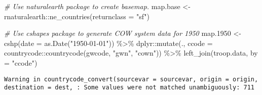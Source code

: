 \documentclass[
]{book}
\newenvironment{Shaded}{\begin{snugshade}}{\end{snugshade}}
\newcommand{\AttributeTok}[1]{\textcolor[rgb]{0.77,0.63,0.00}{#1}}
\newcommand{\CommentTok}[1]{\textcolor[rgb]{0.56,0.35,0.01}{\textit{#1}}}
\newcommand{\FloatTok}[1]{\textcolor[rgb]{0.00,0.00,0.81}{#1}}
\newcommand{\FunctionTok}[1]{\textcolor[rgb]{0.00,0.00,0.00}{#1}}
\newcommand{\NormalTok}[1]{#1}
\newcommand{\OtherTok}[1]{\textcolor[rgb]{0.56,0.35,0.01}{#1}}
\newcommand{\SpecialCharTok}[1]{\textcolor[rgb]{0.00,0.00,0.00}{#1}}
\newcommand{\StringTok}[1]{\textcolor[rgb]{0.31,0.60,0.02}{#1}}
\theoremstyle{definition}
\theoremstyle{definition}
\theoremstyle{definition}
\theoremstyle{definition}
\theoremstyle{remark}
\begin{document}
\begin{Shaded}
\begin{Highlighting}[]
\CommentTok{\# Use naturalearth package to create basemap.}
\NormalTok{map.base }\OtherTok{\textless{}{-}}\NormalTok{ rnaturalearth}\SpecialCharTok{::}\FunctionTok{ne\_countries}\NormalTok{(}\AttributeTok{returnclass =} \StringTok{"sf"}\NormalTok{)}

\CommentTok{\# Use cshapes package to generate COW system data for 1950}
\NormalTok{map}\FloatTok{.1950} \OtherTok{\textless{}{-}} \FunctionTok{cshp}\NormalTok{(}\AttributeTok{date =} \FunctionTok{as.Date}\NormalTok{(}\StringTok{"1950{-}01{-}01"}\NormalTok{)) }\SpecialCharTok{\%\textgreater{}\%}  
\NormalTok{  dplyr}\SpecialCharTok{::}\FunctionTok{mutate}\NormalTok{(., }\AttributeTok{ccode =}\NormalTok{ countrycode}\SpecialCharTok{::}\FunctionTok{countrycode}\NormalTok{(gwcode, }\StringTok{"gwn"}\NormalTok{, }\StringTok{"cown"}\NormalTok{)) }\SpecialCharTok{\%\textgreater{}\%} 
  \FunctionTok{left\_join}\NormalTok{(troop.data, }\AttributeTok{by =} \StringTok{"ccode"}\NormalTok{)}
\end{Highlighting}
\end{Shaded}

\begin{verbatim}
Warning in countrycode_convert(sourcevar = sourcevar, origin = origin, destination = dest, : Some values were not matched unambiguously: 711
\end{verbatim}
\end{document}
